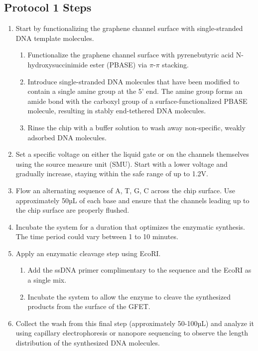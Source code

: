 \documentclass[11pt]{article}
\begin{document}
\subsection*{Protocol 1 Steps}
\begin{enumerate}
    \item Start by functionalizing the graphene channel surface with single-stranded DNA template molecules.
    \begin{enumerate} %
        \item Functionalize the graphene channel surface with pyrenebutyric acid N-hydroxysuccinimide ester (PBASE) via $\pi$-$\pi$ stacking.
        \item Introduce single-stranded DNA molecules that have been modified to contain a single amine group at the 5’ end. The amine group forms an amide bond with the carboxyl group of a surface-functionalized PBASE molecule, resulting in stably end-tethered DNA molecules.
        \item Rinse the chip with a buffer solution to wash away non-specific, weakly adsorbed DNA molecules.
    \end{enumerate}
    \item Set a specific voltage on either the liquid gate or on the channels themselves using the source measure unit (SMU). Start with a lower voltage and gradually increase, staying within the safe range of up to 1.2V.
    \item Flow an alternating sequence of A, T, G, C across the chip surface. Use approximately 50µL of each base and ensure that the channels leading up to the chip surface are properly flushed.
    \item Incubate the system for a duration that optimizes the enzymatic synthesis. The time period could vary between 1 to 10 minutes.
    \item Apply an enzymatic cleavage step using EcoRI.
    \begin{enumerate} %
        \item Add the ssDNA primer complimentary to the sequence and the EcoRI as a single mix.
        \item Incubate the system to allow the enzyme to cleave the synthesized products from the surface of the GFET.
    \end{enumerate}
    \item Collect the wash from this final step (approximately 50-100µL) and analyze it using capillary electrophoresis or nanopore sequencing to observe the length distribution of the synthesized DNA molecules.
\end{enumerate}
\end{document}
